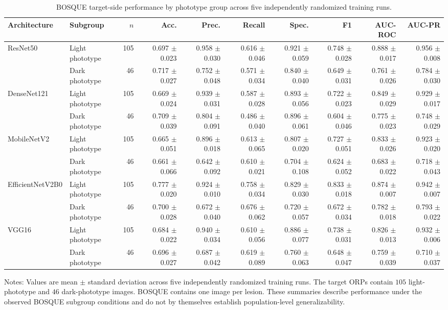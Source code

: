 \begin{table}[h!]
\centering
\scriptsize
\caption{BOSQUE target-side performance by phototype group across five independently randomized training runs.}
\label{tab:bosque-subgroup-performance}
\setlength{\tabcolsep}{3.2pt}
\renewcommand{\arraystretch}{1.08}
\begin{tabular}{llrrrrrrrr}
\toprule
\textbf{Architecture} & \textbf{Subgroup} & \textbf{$n$} & \textbf{Acc.} & \textbf{Prec.} & \textbf{Recall} & \textbf{Spec.} & \textbf{F1} & \textbf{AUC-ROC} & \textbf{AUC-PR} \\
\midrule
ResNet50 & Light phototype & 105 & 0.697 $\pm$ 0.023 & 0.958 $\pm$ 0.030 & 0.616 $\pm$ 0.046 & 0.921 $\pm$ 0.059 & 0.748 $\pm$ 0.028 & 0.888 $\pm$ 0.017 & 0.956 $\pm$ 0.008 \\
 & Dark phototype & 46 & 0.717 $\pm$ 0.027 & 0.752 $\pm$ 0.048 & 0.571 $\pm$ 0.034 & 0.840 $\pm$ 0.040 & 0.649 $\pm$ 0.031 & 0.761 $\pm$ 0.026 & 0.784 $\pm$ 0.030 \\
\addlinespace
DenseNet121 & Light phototype & 105 & 0.669 $\pm$ 0.024 & 0.939 $\pm$ 0.031 & 0.587 $\pm$ 0.028 & 0.893 $\pm$ 0.056 & 0.722 $\pm$ 0.023 & 0.849 $\pm$ 0.029 & 0.929 $\pm$ 0.017 \\
 & Dark phototype & 46 & 0.709 $\pm$ 0.039 & 0.804 $\pm$ 0.091 & 0.486 $\pm$ 0.040 & 0.896 $\pm$ 0.061 & 0.604 $\pm$ 0.046 & 0.775 $\pm$ 0.023 & 0.748 $\pm$ 0.029 \\
\addlinespace
MobileNetV2 & Light phototype & 105 & 0.665 $\pm$ 0.051 & 0.896 $\pm$ 0.018 & 0.613 $\pm$ 0.065 & 0.807 $\pm$ 0.020 & 0.727 $\pm$ 0.051 & 0.833 $\pm$ 0.026 & 0.923 $\pm$ 0.020 \\
 & Dark phototype & 46 & 0.661 $\pm$ 0.066 & 0.642 $\pm$ 0.092 & 0.610 $\pm$ 0.021 & 0.704 $\pm$ 0.108 & 0.624 $\pm$ 0.052 & 0.683 $\pm$ 0.022 & 0.718 $\pm$ 0.043 \\
\addlinespace
EfficientNetV2B0 & Light phototype & 105 & 0.777 $\pm$ 0.020 & 0.924 $\pm$ 0.010 & 0.758 $\pm$ 0.034 & 0.829 $\pm$ 0.030 & 0.833 $\pm$ 0.018 & 0.874 $\pm$ 0.007 & 0.942 $\pm$ 0.007 \\
 & Dark phototype & 46 & 0.700 $\pm$ 0.028 & 0.672 $\pm$ 0.040 & 0.676 $\pm$ 0.062 & 0.720 $\pm$ 0.057 & 0.672 $\pm$ 0.034 & 0.782 $\pm$ 0.018 & 0.793 $\pm$ 0.022 \\
\addlinespace
VGG16 & Light phototype & 105 & 0.684 $\pm$ 0.022 & 0.940 $\pm$ 0.034 & 0.610 $\pm$ 0.056 & 0.886 $\pm$ 0.077 & 0.738 $\pm$ 0.031 & 0.826 $\pm$ 0.013 & 0.932 $\pm$ 0.006 \\
 & Dark phototype & 46 & 0.696 $\pm$ 0.027 & 0.687 $\pm$ 0.042 & 0.619 $\pm$ 0.089 & 0.760 $\pm$ 0.063 & 0.648 $\pm$ 0.047 & 0.759 $\pm$ 0.039 & 0.710 $\pm$ 0.037 \\
\bottomrule
\end{tabular}
\begin{flushleft}
\footnotesize Notes: Values are mean $\pm$ standard deviation across five independently randomized training runs. The target ORPs contain $105$ light-phototype and $46$ dark-phototype images. BOSQUE contains one image per lesion. These summaries describe performance under the observed BOSQUE subgroup conditions and do not by themselves establish population-level generalizability.
\end{flushleft}
\end{table}
